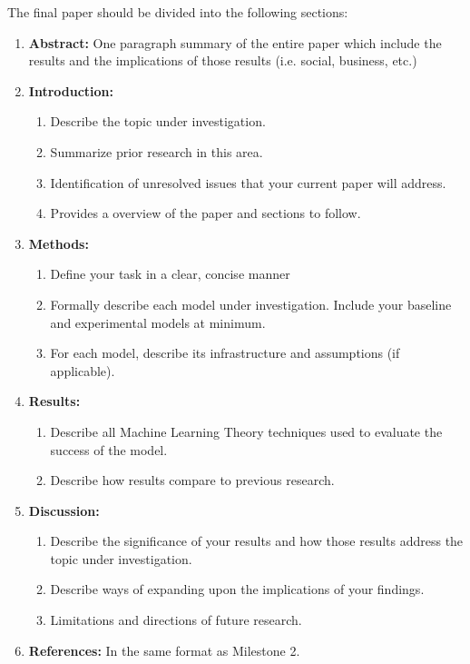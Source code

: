 The final paper should be divided into the following sections:
\begin{enumerate}
    \item \textbf{Abstract:} One paragraph summary of the entire paper which include the results and the implications of those results (i.e. social, business, etc.)
    \item \textbf{Introduction:}
    \begin{enumerate}
        \item Describe the topic under investigation.
        \item Summarize prior research in this area.
        \item Identification of unresolved issues that your current paper will address.
        \item Provides a overview of the paper and sections to follow.
    \end{enumerate}
    \item \textbf{Methods:}
    \begin{enumerate}
        \item Define your task in a clear, concise manner
        \item Formally describe each model under investigation. Include your baseline and experimental models at minimum.
        \item For each model, describe its infrastructure and assumptions (if applicable).
    \end{enumerate}
    \item \textbf{Results:}
    \begin{enumerate}
        \item Describe all Machine Learning Theory techniques used to evaluate the success of the model.
        \item Describe how results compare to previous research.
    \end{enumerate}
    \item \textbf{Discussion:}
    \begin{enumerate}
        \item Describe the significance of your results and how those results address the topic under investigation.
        \item Describe ways of expanding upon the implications of your findings.
        \item Limitations and directions of future research.
    \end{enumerate}
    \item \textbf{References:} In the same format as Milestone 2.
\end{enumerate}

